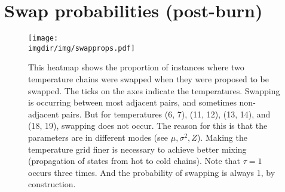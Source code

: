 \documentclass[10pt]{article} %
\def\imgdir{../../results/test-sim-6-7-4/maxtemp2-ntempts20-degree2-N500}
\begin{document}
\section{Swap probabilities (post-burn)}
\begin{figure}[H]
  \centering
  \texttt{[image: \\imgdir/img/swapprops.pdf]}
  \caption{This heatmap shows the proportion of instances where two
  temperature chains were swapped when they were proposed to be swapped. The
  ticks on the axes indicate the temperatures. Swapping is occurring between
  most adjacent pairs, and sometimes non-adjacent pairs. But for temperatures
  (6, 7), (11, 12), (13, 14), and (18, 19), swapping does not occur. The reason
  for this is that the parameters are in different modes (see $\mu, \sigma^2,
  Z$). Making the temperature grid finer is necessary to achieve better mixing
  (propagation of states from hot to cold chains). Note that $\tau=1$ occurs
  three times. And the probability of swapping is always 1, by construction.}
\end{figure}

\newpage
\end{document}
